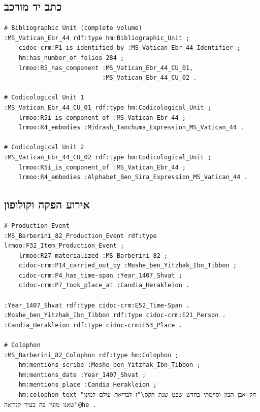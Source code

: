 \documentclass[12pt,a4paper]{article}
\newcommand{\en}[1]{\textenglish{\LR{#1}}}
\begin{document}
\subsection{כתב יד מורכב \en{(BU + CUs)}}

\begin{LTR}
\begin{verbatim}
# Bibliographic Unit (complete volume)
:MS_Vatican_Ebr_44 rdf:type hm:Bibliographic_Unit ;
    cidoc-crm:P1_is_identified_by :MS_Vatican_Ebr_44_Identifier ;
    hm:has_number_of_folios 284 ;
    lrmoo:R5_has_component :MS_Vatican_Ebr_44_CU_01, 
                           :MS_Vatican_Ebr_44_CU_02 .

# Codicological Unit 1
:MS_Vatican_Ebr_44_CU_01 rdf:type hm:Codicological_Unit ;
    lrmoo:R5i_is_component_of :MS_Vatican_Ebr_44 ;
    lrmoo:R4_embodies :Midrash_Tanchuma_Expression_MS_Vatican_44 .

# Codicological Unit 2
:MS_Vatican_Ebr_44_CU_02 rdf:type hm:Codicological_Unit ;
    lrmoo:R5i_is_component_of :MS_Vatican_Ebr_44 ;
    lrmoo:R4_embodies :Alphabet_Ben_Sira_Expression_MS_Vatican_44 .
\end{verbatim}
\end{LTR}

\subsection{אירוע הפקה וקולופון}

\begin{LTR}
\begin{verbatim}
# Production Event
:MS_Barberini_82_Production_Event rdf:type lrmoo:F32_Item_Production_Event ;
    lrmoo:R27_materialized :MS_Barberini_82 ;
    cidoc-crm:P14_carried_out_by :Moshe_ben_Yitzhak_Ibn_Tibbon ;
    cidoc-crm:P4_has_time-span :Year_1407_Shvat ;
    cidoc-crm:P7_took_place_at :Candia_Herakleion .

:Year_1407_Shvat rdf:type cidoc-crm:E52_Time-Span .
:Moshe_ben_Yitzhak_Ibn_Tibbon rdf:type cidoc-crm:E21_Person .
:Candia_Herakleion rdf:type cidoc-crm:E53_Place .

# Colophon
:MS_Barberini_82_Colophon rdf:type hm:Colophon ;
    hm:mentions_scribe :Moshe_ben_Yitzhak_Ibn_Tibbon ;
    hm:mentions_date :Year_1407_Shvat ;
    hm:mentions_place :Candia_Herakleion ;
    hm:colophon_text "חק אבן תבון וסיימתי בחדש שבט שנת הקס\"ז לבריאת עולם למינן שאנו מונין פה בעיר קנדיאה"@he .
\end{verbatim}
\end{LTR}
\end{document}
